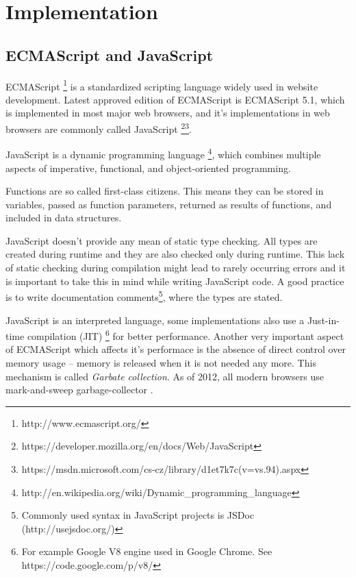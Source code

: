\chapter{Implementation}





\section{ECMAScript and JavaScript}
ECMAScript \footnote{http://www.ecmascript.org/} is a standardized scripting language widely used in website development. Latest approved edition of ECMAScript is ECMAScript 5.1, which is implemented in most major web browsers, and it's implementations in web browsers are commonly called JavaScript \footnote{https://developer.mozilla.org/en/docs/Web/JavaScript}\footnote{https://msdn.microsoft.com/cs-cz/library/d1et7k7c(v=vs.94).aspx}. 

JavaScript is a dynamic programming language \footnote{http://en.wikipedia.org/wiki/Dynamic\_programming\_language}, which combines multiple aspects of imperative, functional, and object-oriented programming.

Functions are so called first-class citizens. This means they can be stored in variables, passed as function parameters, returned as results of functions, and included in data structures.

JavaScript doesn't provide any mean of static type checking. All types are created during runtime and they are also checked only during runtime. This lack of static checking during compilation might lead to rarely occurring errors and it is important to take this in mind while writing JavaScript code. A good practice is to write documentation comments\footnote{Commonly used syntax in JavaScript projects is JSDoc (http://usejsdoc.org/)}, where the types are stated.

JavaScript is an interpreted language, some implementations also use a Just-in-time compilation (JIT) \footnote{For example Google V8 engine used in Google Chrome. See https://code.google.com/p/v8/} for better performance.  Another very important aspect of ECMAScript which affects it's performace is the absence of direct control over memory usage -- memory is released when it is not needed any more. This mechanism is called \textit{Garbate collection}. As of 2012, all modern browsers use mark-and-sweep garbage-collector \cite{mdn_memmory_management}.

